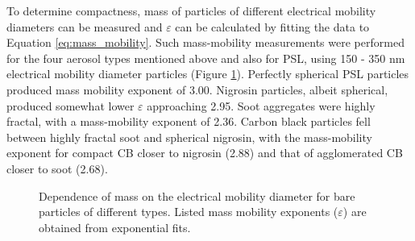 To determine compactness, mass of particles of different electrical mobility diameters can be measured and $\varepsilon$ can be calculated by fitting the data to Equation \ref{eq:mass_mobility}. Such mass-mobility measurements were performed for the four aerosol types mentioned above and also for PSL, using 150 - 350 nm electrical mobility diameter particles (Figure \ref{fig:mass_mobility}). Perfectly spherical PSL particles produced mass mobility exponent of 3.00. Nigrosin particles, albeit spherical, produced  somewhat lower $\varepsilon$ approaching 2.95. Soot aggregates were highly fractal, with a mass-mobility exponent of 2.36. Carbon black particles fell between highly fractal soot and spherical nigrosin, with the mass-mobility exponent for compact CB closer to nigrosin (2.88) and that of agglomerated CB closer to soot (2.68).

\begin{figure}[htp]
    \centering
    \caption{Dependence of mass on the electrical mobility diameter for bare particles of different types. Listed mass mobility exponents ($\varepsilon$) are obtained from exponential fits.}
    \label{fig:mass_mobility}
\end{figure}

